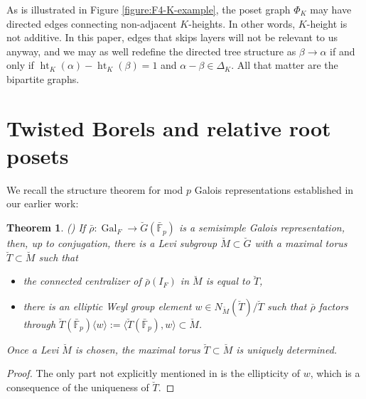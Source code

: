 \documentclass[11pt]{amsart}
\newtheorem{thm}{Theorem}[section]
\theoremstyle{definition}
\newcommand{\bFp}{\bar{\mathbb{F}}_p}
\newcommand{\bG}{\breve{G}}
\newcommand{\bM}{\breve{M}}
\newcommand{\bT}{\breve{T}}
\DeclareMathOperator{\Ht}{ht}
\DeclareMathOperator{\Gal}{Gal}
\begin{document}
As is illustrated in Figure \ref{figure:F4-K-example},
the poset graph $\Phi_K$
may have directed edges
connecting non-adjacent $K$-heights.
In other words,
$K$-height is not additive.
In this paper,
edges that skips layers
will not be relevant
to us anyway,
and we may as well redefine
the directed tree structure
as $\beta\to \alpha$
if and only if
$\Ht_K(\alpha)-\Ht_K(\beta)=1$
and $\alpha-\beta\in \Delta_K$.
All that matter are the bipartite graphs.




\section{Twisted Borels and relative root posets}

We recall the structure theorem for mod $p$ Galois representations
established in our earlier work:

\begin{thm} (\cite[Theorem 4]{Lin22})
\rm
If $\bar\rho:\Gal_F\to \bG(\bFp)$
is a semisimple Galois representation,
then, up to conjugation, there
is a Levi subgroup $\bM\subset \bG$
with a maximal torus $\bT\subset \bM$
such that
\begin{itemize}
\item the connected centralizer of $\bar\rho(I_F)$
in $\bM$ is equal to $\bT$,

\item there is an {\it elliptic Weyl group element}
$w\in N_{\bM}(\bT)/\bT$ such that
$\bar\rho$ factors through $\bT(\bFp) \langle w\rangle
:=\langle\bT(\bFp), w\rangle
\subset \bM$.
\end{itemize}
Once a Levi $\bM$ is chosen, the maximal torus
$\bT\subset \bM$ is uniquely determined.
\end{thm}

\begin{proof}
The only part not explicitly mentioned in \cite[Theorem 4]{Lin22}
is the ellipticity of $w$,
which is a consequence of the uniqueness
of $\bT$.
\end{proof}
\end{document}
